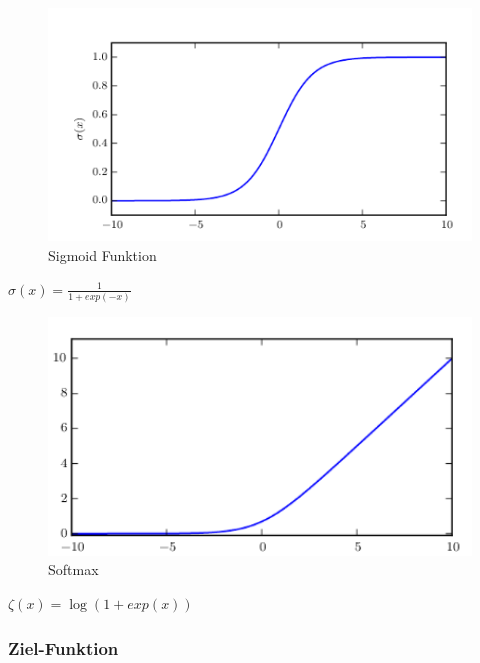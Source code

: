 \documentclass{llncs}
\begin{document}
\begin{figure}[htbp] 
	\centering
	\includegraphics[width=1.0\textwidth]{sigmoid.png}
	\caption{Sigmoid Funktion}
	\label{fig:Bild1}
\end{figure}

\begin{math}
\sigma(x)=\frac{1}{1+exp(-x)}
\end{math}

\begin{figure}[htbp] 
	\centering
	\includegraphics[width=1.0\textwidth]{softmax.png}
	\caption{Softmax}
	\label{fig:Bild1}
\end{figure}

\begin{math}
\zeta(x) = \log(1+exp(x))
\end{math}

\newpage
\subsubsection[short title]{Ziel-Funktion}
\end{document}
